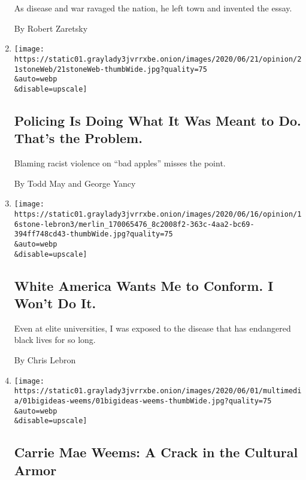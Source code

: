 \begin{enumerate}
  As disease and war ravaged the nation, he left town and invented the
  essay.

  By Robert Zaretsky
\item
  \href{/2020/06/21/opinion/police-violence-racism-reform.html}{}

  \texttt{[image: https://static01.graylady3jvrrxbe.onion/images/2020/06/21/opinion/21stoneWeb/21stoneWeb-thumbWide.jpg?quality=75\\\&auto=webp\\\&disable=upscale]}

  \hypertarget{policing-is-doing-what-it-was-meant-to-do-thats-the-problem}{%
  \subsection{Policing Is Doing What It Was Meant to Do. That's the
  Problem.}\label{policing-is-doing-what-it-was-meant-to-do-thats-the-problem}}

  Blaming racist violence on ``bad apples'' misses the point.

  By Todd May and George Yancy
\item
  \href{/2020/06/16/opinion/black-academia-racism.html}{}

  \texttt{[image: https://static01.graylady3jvrrxbe.onion/images/2020/06/16/opinion/16stone-lebron3/merlin\_170065476\_8c2008f2-363c-4aa2-bc69-394ff748cd43-thumbWide.jpg?quality=75\\\&auto=webp\\\&disable=upscale]}

  \hypertarget{white-america-wants-me-to-conform-i-wont-do-it}{%
  \subsection{White America Wants Me to Conform. I Won't Do
  It.}\label{white-america-wants-me-to-conform-i-wont-do-it}}

  Even at elite universities, I was exposed to the disease that has
  endangered black lives for so long.

  By Chris Lebron
\item
  \href{/2020/06/01/opinion/carrie-mae-weems-black-television.html}{}

  \texttt{[image: https://static01.graylady3jvrrxbe.onion/images/2020/06/01/multimedia/01bigideas-weems/01bigideas-weems-thumbWide.jpg?quality=75\\\&auto=webp\\\&disable=upscale]}

  \hypertarget{carrie-mae-weems-a-crack-in-the-cultural-armor}{%
  \subsection{Carrie Mae Weems: A Crack in the Cultural
  Armor}\label{carrie-mae-weems-a-crack-in-the-cultural-armor}}


\end{enumerate}

